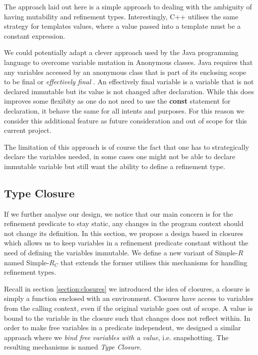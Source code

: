 \documentclass[a4paper,12pt]{report}
\begin{document}
\par
The approach laid out here is a simple approach to dealing with the ambiguity of 
having mutability and refinement types. Interestingly, C++ utilises the same 
strategy for templates values, where a value passed into a template must be a 
constant expression. 

\par
We could potentially adapt a clever approach used by the Java programming 
language to overcome variable mutation in Anonymous classes. Java requires that 
any variables accessed by an anonymous class that is part of 
its enclosing scope to be final or \textit{effectively final} 
\cite{effectFinal}. An effectively final variable is a variable that is not 
declared immutable but its value is not changed after declaration. While this 
does improves some flexibity as one do not need to use the \textbf{const} 
statement for declaration, it behave the same for all intents and purposes. 
For this reason we consider this additional feature as future consideration and 
out of scope for this current project. 

\par
The limitation of this approach is of course the fact that one has to strategically 
declare the variables needed, in some cases one might not be able to declare 
immutable variable but still want the ability to define a refinement type.

\subsection{Type Closure}
If we further analyse our design, we notice that our main concern is for the 
refinement predicate to stay static, any changes in the program context should 
not change its definition. In this section, we propose a design based in closures 
which allows us to keep variables in a refinement predicate constant without 
the need of defining the variables immutable. We define a new variant of 
Simple-$R$ named Simple-$R_{C}$ that extends the former utilises this mechanisms 
for handling refinement types. 

\par
Recall in section \ref{section:closures} we introduced the idea of closures, a 
closure is simply a function enclosed with an environment. Closures have access to 
variables from the calling context, even if the original variable goes out of 
scope. A value is bound to the variable in the closure such that changes does 
not reflect within. In order to make free variables in a predicate independent, 
we designed a similar approach where we \emph{bind free variables with a value}, 
i.e. snapshotting. The resulting mechanisms is named \emph{Type Closure}.
\end{document}
